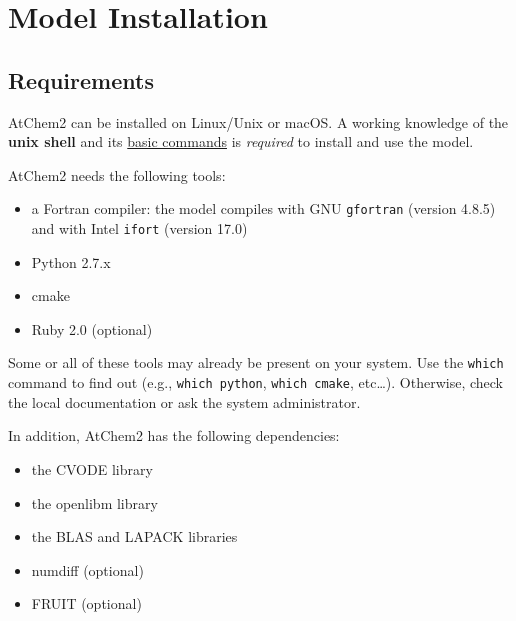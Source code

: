 %
%
%
%
\chapter{Model Installation} \label{ch:installation}

\section{Requirements} \label{sec:requirements}

AtChem2 can be installed on Linux/Unix or macOS. A working knowledge
of the \textbf{unix shell} and its
\href{https://swcarpentry.github.io/shell-novice/reference/}{basic
  commands} is \emph{required} to install and use the model.

AtChem2 needs the following tools:

\begin{itemize}
\item a Fortran compiler: the model compiles with GNU
  \texttt{gfortran} (version 4.8.5) and with Intel \texttt{ifort}
  (version 17.0)
\item Python 2.7.x
\item cmake
\item Ruby 2.0 (optional)
\end{itemize}

Some or all of these tools may already be present on your system. Use
the \texttt{which} command to find out (e.g., \texttt{which\ python},
\texttt{which\ cmake}, etc\ldots{}). Otherwise, check the local
documentation or ask the system administrator.

In addition, AtChem2 has the following dependencies:

\begin{itemize}
\item the CVODE library
\item the openlibm library
\item the BLAS and LAPACK libraries
\item numdiff (optional)
\item FRUIT (optional)
\end{itemize}

